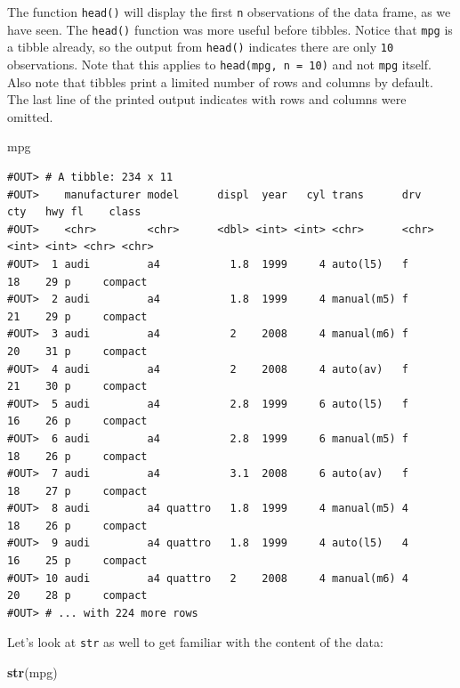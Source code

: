 \documentclass[]{book}
\newenvironment{Shaded}{\begin{snugshade}}{\end{snugshade}}
\newcommand{\KeywordTok}[1]{\textcolor[rgb]{0.13,0.29,0.53}{\textbf{#1}}}
\newcommand{\NormalTok}[1]{#1}
\begin{document}
The function \texttt{head()} will display the first \texttt{n} observations of the data frame, as we have seen. The \texttt{head()} function was more useful before tibbles. Notice that \texttt{mpg} is a tibble already, so the output from \texttt{head()} indicates there are only \texttt{10} observations. Note that this applies to \texttt{head(mpg,\ n\ =\ 10)} and not \texttt{mpg} itself. Also note that tibbles print a limited number of rows and columns by default. The last line of the printed output indicates with rows and columns were omitted.

\begin{Shaded}
\begin{Highlighting}[]
\NormalTok{mpg}
\end{Highlighting}
\end{Shaded}

\begin{verbatim}
#OUT> # A tibble: 234 x 11
#OUT>    manufacturer model      displ  year   cyl trans      drv     cty   hwy fl    class  
#OUT>    <chr>        <chr>      <dbl> <int> <int> <chr>      <chr> <int> <int> <chr> <chr>  
#OUT>  1 audi         a4           1.8  1999     4 auto(l5)   f        18    29 p     compact
#OUT>  2 audi         a4           1.8  1999     4 manual(m5) f        21    29 p     compact
#OUT>  3 audi         a4           2    2008     4 manual(m6) f        20    31 p     compact
#OUT>  4 audi         a4           2    2008     4 auto(av)   f        21    30 p     compact
#OUT>  5 audi         a4           2.8  1999     6 auto(l5)   f        16    26 p     compact
#OUT>  6 audi         a4           2.8  1999     6 manual(m5) f        18    26 p     compact
#OUT>  7 audi         a4           3.1  2008     6 auto(av)   f        18    27 p     compact
#OUT>  8 audi         a4 quattro   1.8  1999     4 manual(m5) 4        18    26 p     compact
#OUT>  9 audi         a4 quattro   1.8  1999     4 auto(l5)   4        16    25 p     compact
#OUT> 10 audi         a4 quattro   2    2008     4 manual(m6) 4        20    28 p     compact
#OUT> # ... with 224 more rows
\end{verbatim}

Let's look at \texttt{str} as well to get familiar with the content of the data:

\begin{Shaded}
\begin{Highlighting}[]
\KeywordTok{str}\NormalTok{(mpg)}
\end{Highlighting}
\end{Shaded}
\end{document}
